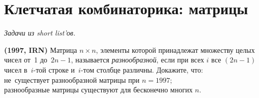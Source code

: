 

\section*{Клетчатая комбинаторика: матрицы}


\begingroup
\providecommand\ifincludesolutions{\iffalse}


\emph{Задачи из short list'ов.}

\ifincludesolutions
\textbf{Версия с решениями.}
\emph{Решения являются слабообработанным переводом с~английского.
Beware!}
\fi

\begin{problems}

\item\textbf{(1997, IRN)}
Матрица $n \times n$, элементы которой принадлежат множеству целых чисел
от~1 до~$2 n - 1$, называется \emph{разнообразной}, если при всех
$i$ все $(2 n - 1)$ чисел в~$i$-той строке и~$i$-том столбце различны.
Докажите, что:
\\
\sp
не~существует разнообразной матрицы при $n = 1997$;
\\
\sp
разнообразные матрицы существуют для бесконечно многих $n$.

\end{problems}

